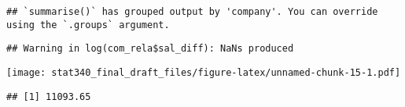 \documentclass[
]{article}
\newenvironment{Shaded}{\begin{snugshade}}{\end{snugshade}}
\newcommand{\FunctionTok}[1]{\textcolor[rgb]{0.00,0.00,0.00}{#1}}
\newcommand{\NormalTok}[1]{#1}
\newcommand{\SpecialCharTok}[1]{\textcolor[rgb]{0.00,0.00,0.00}{#1}}
\begin{document}
\begin{verbatim}
## `summarise()` has grouped output by 'company'. You can override using the `.groups` argument.
\end{verbatim}

\begin{Shaded}
\end{Shaded}

\begin{verbatim}
## Warning in log(com_rela$sal_diff): NaNs produced
\end{verbatim}

\texttt{[image: stat340\_final\_draft\_files/figure-latex/unnamed-chunk-15-1.pdf]}

\begin{Shaded}
\end{Shaded}

\begin{verbatim}
## [1] 11093.65
\end{verbatim}
\end{document}

